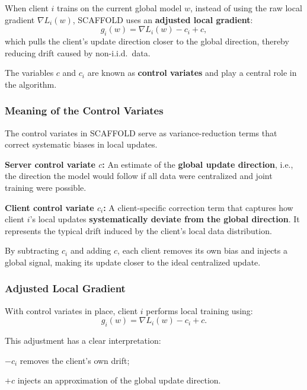 When client $i$ trains on the current global model $w$, instead of using the raw local
gradient $\nabla L_i(w)$, SCAFFOLD uses an \textbf{adjusted local gradient}:
\[
g_i(w) = \nabla L_i(w) - c_i + c,
\]
which pulls the client’s update direction closer to the global direction, thereby reducing
drift caused by non-i.i.d.\ data.

The variables $c$ and $c_i$ are known as \textbf{control variates} and play a central role
in the algorithm.

\subsubsection{Meaning of the Control Variates}

The control variates in SCAFFOLD serve as variance-reduction terms that correct systematic
biases in local updates.

\begin{compactitemize}
    \item \textbf{Server control variate $c$:}  
    An estimate of the \textbf{global update direction}, i.e., the direction the model would
    follow if all data were centralized and joint training were possible.

    \item \textbf{Client control variate $c_i$:}  
    A client-specific correction term that captures how client $i$’s local updates
    \textbf{systematically deviate from the global direction}. It represents the typical
    drift induced by the client’s local data distribution.
\end{compactitemize}

By subtracting $c_i$ and adding $c$, each client removes its own bias and injects a global
signal, making its update closer to the ideal centralized update.

\subsubsection{Adjusted Local Gradient}

With control variates in place, client $i$ performs local training using:
\[
g_i(w) = \nabla L_i(w) - c_i + c.
\]

This adjustment has a clear interpretation:
\begin{compactitemize}
    \item $-c_i$ removes the client’s own drift;
    \item $+c$ injects an approximation of the global update direction.
\end{compactitemize}

